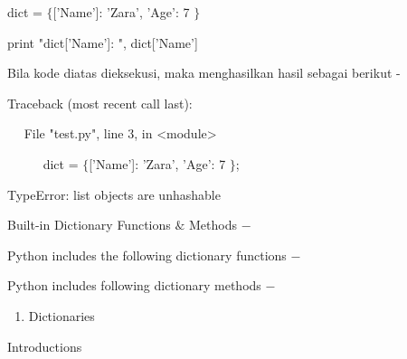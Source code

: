 \vspace{12pt}
\noindent 
 \hspace*{0.5in} dict =  $  \{  $['Name']: 'Zara', 'Age': 7 $  \}  $ \par
\vspace{12pt}
\noindent 
 \hspace*{0.5in} print "dict['Name']: ", dict['Name'] \par
\noindent 
Bila kode diatas dieksekusi, maka menghasilkan hasil sebagai berikut - \par
\noindent 
 \hspace*{0.5in} Traceback (most recent call last): \par
\noindent 
~~  \hspace*{0.5in}  \hspace*{0.5in} File "test.py", line 3, in <module> \par
\noindent 
~~~~~  \hspace*{0.5in}  \hspace*{0.5in} dict =  $  \{  $['Name']: 'Zara', 'Age': 7 $  \}  $; \par
\noindent 
 \hspace*{0.5in} TypeError: list objects are unhashable \par
\vspace{12pt}
\vspace{12pt}
\vspace{12pt}
\noindent 
Built-in Dictionary Functions  $  \&  $ Methods  $ - $ \par
\noindent 
Python includes the following dictionary functions  $ - $ \par
\noindent 
Python includes following dictionary methods  $ - $ \par
\vspace{12pt}
\vspace{12pt}
\vspace{12pt}
\noindent 
\vspace{\baselineskip}
\vspace{12pt}
\vspace{12pt}
\vspace{12pt}
\begin{enumerate}
	\item Dictionaries
\end{enumerate}
\vspace{12pt}
\noindent 
Introductions \par
\noindent 
